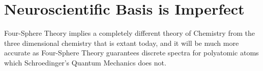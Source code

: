 \documentclass{amsart}
\begin{document}
\section{Neuroscientific Basis is Imperfect}

Four-Sphere Theory implies a completely different theory of Chemistry from the three dimensional chemistry that is extant today, and it will be much more accurate as Four-Sphere Theory guarantees discrete spectra for polyatomic atoms which Schroedinger's Quantum Mechanics does not.
\end{document}
